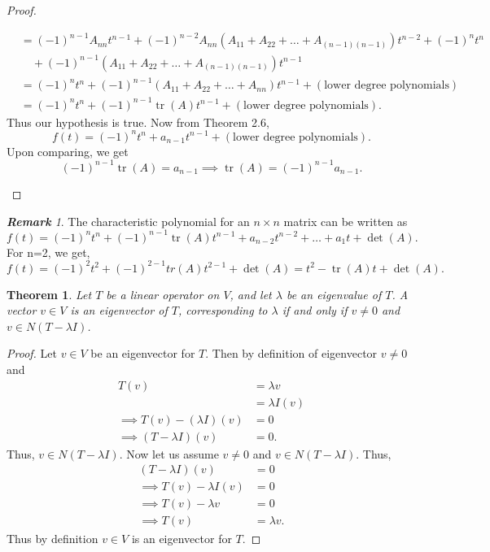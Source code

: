 \documentclass[12pt, a4paper]{article}
\newtheorem{theorem}{Theorem}[section]
\theoremstyle{definition}
\theoremstyle{remark}
\newtheorem*{remark}{\textbf{Remark}}
\DeclareMathOperator{\tr}{tr}
\begin{document}
\begin{proof}
\begin{enumerate}
\begin{align*}
    &= (-1)^{n-1} A_{nn} t^{n-1} + (-1)^{n-2} A_{nn} (A_{11} + A_{22} + \dots + A_{(n-1)(n-1)}) t^{n-2} + (-1)^n t^n \\
    &\quad + (-1)^{n-1} (A_{11} + A_{22} + \dots + A_{(n-1)(n-1)}) t^{n-1} \\
    &= (-1)^n t^n + (-1)^{n-1} (A_{11} + A_{22} + \dots + A_{nn}) t^{n-1} + (\text{lower degree polynomials}) \\
    &= (-1)^n t^n + (-1)^{n-1} \tr(A) t^{n-1} + (\text{lower degree polynomials}).
    \end{align*}
    Thus our hypothesis is true. Now from Theorem 2.6,
    \[
    f(t) = (-1)^n t^n + a_{n-1} t^{n-1} + (\text{lower degree polynomials}).
    \]
    Upon comparing, we get
    \[
    (-1)^{n-1} \tr(A) = a_{n-1} \implies \tr(A) = (-1)^{n-1} a_{n-1}.
    \]
\end{enumerate}
\end{proof}

\begin{remark}
    The characteristic polynomial for an $n \times n$ matrix can be written as
    \[
    f(t)=(-1)^nt^n + (-1)^{n-1}\tr(A)t^{n-1}+a_{n-2}t^{n-2}+\ldots+a_1t+\det(A).
    \]
    For n=2, we get,
    \[
    f(t)=(-1)^2t^2 + (-1)^{2-1}tr(A)t^{2-1}+\det(A) = t^2 - \tr(A)t + \det(A).
    \]
\end{remark}

\begin{theorem}
Let $T$ be a linear operator on $V$, and let $\lambda$ be an eigenvalue of $T$. A vector $v \in V$ is an eigenvector of $T$, corresponding to $\lambda$ if and only if $v \neq 0$ and $v \in N(T - \lambda I)$.
\end{theorem}

\begin{proof}
Let $v \in V$ be an eigenvector for $T$. Then by definition of eigenvector $v \neq 0$ and
\begin{align*}
T(v) &= \lambda v \\
&= \lambda I(v) \\
\implies T(v) - (\lambda I)(v) &= 0 \\
\implies (T - \lambda I)(v) &= 0.
\end{align*}
Thus, $v \in N(T - \lambda I)$. Now let us assume $v \neq 0$ and $v \in N(T - \lambda I)$. Thus,
\begin{align*}
(T - \lambda I)(v) &= 0 \\
\implies T(v) - \lambda I(v) &= 0 \\
\implies T(v) - \lambda v &= 0 \\
\implies T(v) &= \lambda v.
\end{align*}
Thus by definition $v \in V$ is an eigenvector for $T$. \qedhere
\end{proof}
\end{document}
